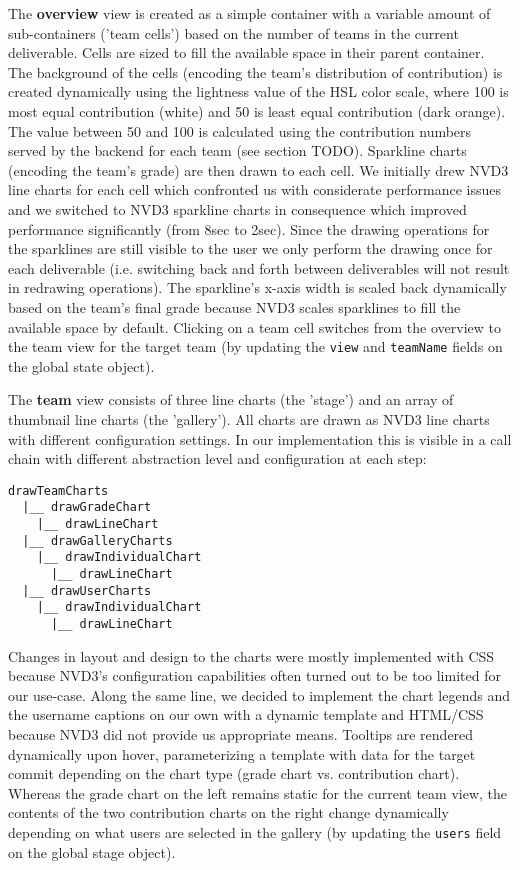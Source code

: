 \documentclass[../manifest.tex]{subfiles}
\begin{document}
The \textbf{overview} view is created as a simple container with a variable amount of sub-containers ('team cells') based on the number of teams in the current deliverable. Cells are sized to fill the available space in their parent container. The background of the cells (encoding the team's distribution of contribution) is created dynamically using the lightness value of the HSL color scale, where 100 is most equal contribution (white) and 50 is least equal contribution (dark orange). The value between 50 and 100 is calculated using the contribution numbers served by the backend for each team (see section TODO). Sparkline charts (encoding the team's grade) are then drawn to each cell. We initially drew NVD3 line charts for each cell which confronted us with considerate performance issues and we switched to NVD3 sparkline charts in consequence which improved performance significantly (from \texttildelow8sec to \texttildelow2sec). Since the drawing operations for the sparklines are still visible to the user we only perform the drawing once for each deliverable (i.e. switching back and forth between deliverables will not result in redrawing operations). The sparkline's x-axis width is scaled back dynamically based on the team's final grade because NVD3 scales sparklines to fill the available space by default. Clicking on a team cell switches from the overview to the team view for the target team (by updating the \texttt{view} and \texttt{teamName} fields on the global state object).

The \textbf{team} view consists of three line charts (the 'stage') and an array of thumbnail line charts (the 'gallery'). All charts are drawn as NVD3 line charts with different configuration settings. In our implementation this is visible in a call chain with different abstraction level and configuration at each step:
\begin{verbatim}
drawTeamCharts
  |__ drawGradeChart
    |__ drawLineChart
  |__ drawGalleryCharts
    |__ drawIndividualChart
      |__ drawLineChart
  |__ drawUserCharts
    |__ drawIndividualChart
      |__ drawLineChart
\end{verbatim}

Changes in layout and design to the charts were mostly implemented with CSS because NVD3's configuration capabilities often turned out to be too limited for our use-case. Along the same line, we decided to implement the chart legends and the username captions on our own with a dynamic template and HTML/CSS because NVD3 did not provide us appropriate means. Tooltips are rendered dynamically upon hover, parameterizing a template with data for the target commit depending on the chart type (grade chart vs. contribution chart). Whereas the grade chart on the left remains static for the current team view, the contents of the two contribution charts on the right change dynamically depending on what users are selected in the gallery (by updating the \texttt{users} field on the global stage object).
\end{document}
